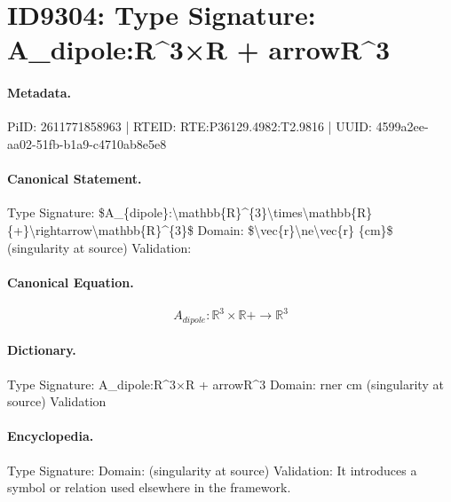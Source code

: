 \section*{ID9304: Type Signature: A\_dipole:R\textasciicircum{}3×R + arrowR\textasciicircum{}3}
\paragraph{Metadata.}
PiID: 2611771858963 | RTEID: RTE:P36129.4982:T2.9816 | UUID: 4599a2ee-aa02-51fb-b1a9-c4710ab8e5e8

\paragraph{Canonical Statement.}
Type Signature: \$A\_\{dipole\}:\textbackslash{}mathbb\{R\}\textasciicircum{}\{3\}\textbackslash{}times\textbackslash{}mathbb\{R\} \{+\}\textbackslash{}rightarrow\textbackslash{}mathbb\{R\}\textasciicircum{}\{3\}\$ Domain: \$\textbackslash{}vec\{r\}\textbackslash{}ne\textbackslash{}vec\{r\} \{cm\}\$ (singularity at source) Validation:

\paragraph{Canonical Equation.}
\[
A_{dipole}:\mathbb{R}^{3}\times\mathbb{R} {+}\rightarrow\mathbb{R}^{3}
\]

\paragraph{Dictionary.}
Type Signature: A\_dipole:R\textasciicircum{}3×R + arrowR\textasciicircum{}3 Domain: rner cm (singularity at source) Validation

\paragraph{Encyclopedia.}
Type Signature: Domain: (singularity at source) Validation: It introduces a symbol or relation used elsewhere in the framework.
